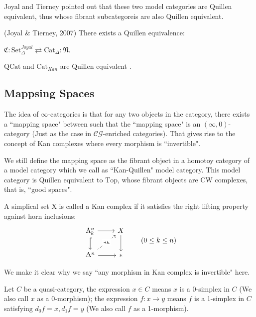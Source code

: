 Joyal and Tierney pointed out that these two model categories are Quillen equivalent, thus whose fibrant subcategoreis are also Quillen equivalent.

\begin{theorem}(Joyal \& Tierney, 2007)
    There exists a Quillen equivalence:

    $\mathfrak{C}:\text{Set}_\Delta^{Joyal} \rightleftarrows \text{Cat}_\Delta:\mathfrak{N}$.
\end{theorem}

\begin{corollary}
    $\text{QCat}$ and $\text{Cat}_{Kan}$ are Quillen equivalent .
\end{corollary}

\subsection{Mappsing Spaces}\label{mapping_space}

The idea of $\infty$-categories is that for any two objects in the category, there exists a ``mapping space" between such that the ``mapping space" is an $(\infty,0)$-category (Just as the case in $\mathcal{CG}$-enriched categories). That gives rise to the concept of Kan complexes where every morphism is ``invertible".

We still define the mapping space as the fibrant object in a homotoy category of a model category which we call as ``Kan-Quillen" model category. This model category is Quillen equivalent to $\text{Top}$, whose fibrant objects are CW complexes, that is, ``good spaces".





\begin{definition}\label{kan-complex}
    A simplical set X is called a Kan complex if it satisfies the right lifting property against horn inclusions:
\[
\begin{tikzcd}
\Lambda^n_k \arrow[r] \arrow[d, hook] & X \arrow[d] \\
\Delta^n \arrow[r] \arrow[ur, dashed, "\exists h" description] & \ast
\end{tikzcd}
\qquad(0 \leq k \leq n)
\]
\end{definition}

We make it clear why we say ``any morphism in Kan complex is invertible" here.

\begin{remark}
    Let $C$ be a quasi-category, the expression $x\in C$ means $x$ is a 0-simplex in $C$ (We also call $x$ as a 0-morphism); the expression $f:x\to y$ means $f$ is a 1-simplex in $C$ satisfying $d_0f=x,d_1f=y$ (We also call $f$ as a 1-morphism).
\end{remark}

